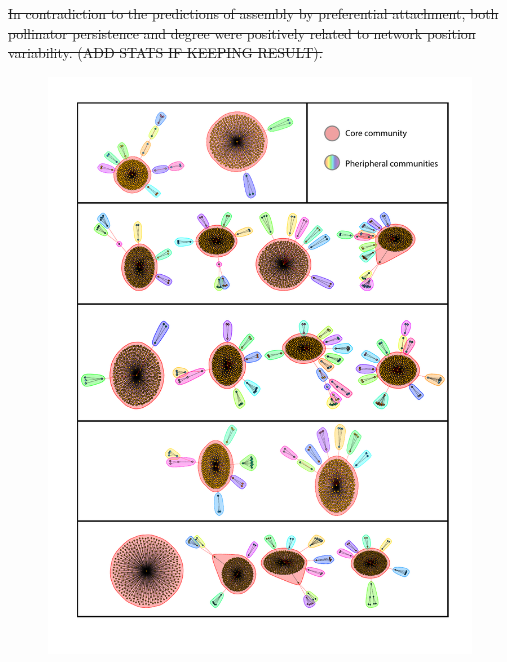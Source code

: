 \documentclass[12pt]{article}
\providecommand{\DIFaddtex}[1]{{\protect\color{blue}\uwave{#1}}} %
\providecommand{\DIFdeltex}[1]{{\protect\color{red}\sout{#1}}}                      %
\providecommand{\DIFaddbegin}{} %
\providecommand{\DIFaddend}{} %
\providecommand{\DIFdelbegin}{} %
\providecommand{\DIFdelend}{} %
\providecommand{\DIFaddFL}[1]{\DIFadd{#1}} %
\providecommand{\DIFadd}[1]{\texorpdfstring{\DIFaddtex{#1}}{#1}} %
\providecommand{\DIFdel}[1]{\texorpdfstring{\DIFdeltex{#1}}{}} %
\begin{document}
\DIFdelbegin \DIFdel{In contradiction to the predictions of assembly by preferential
attachment, both pollinator persistence and degree were positively
related to network position variability. (ADD STATS IF KEEPING
RESULT).
}\DIFdelend %
\DIFaddbegin \begin{figure}
  \centering
  \includegraphics[width=.8\textwidth]{../analysis/changePoint/plotting/communities.pdf}
  \caption{\DIFaddFL{XXX}}
  \label{fig:communities}
\end{figure}
\clearpage
\DIFaddend 
\end{document}
